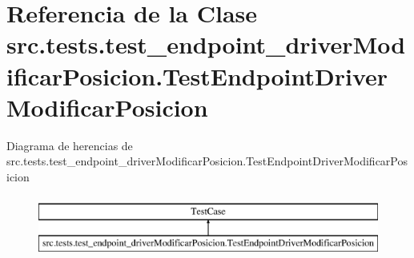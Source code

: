 \hypertarget{classsrc_1_1tests_1_1test__endpoint__driver_modificar_posicion_1_1_test_endpoint_driver_modificar_posicion}{\section{Referencia de la Clase src.\-tests.\-test\-\_\-endpoint\-\_\-driver\-Modificar\-Posicion.\-Test\-Endpoint\-Driver\-Modificar\-Posicion}
\label{classsrc_1_1tests_1_1test__endpoint__driver_modificar_posicion_1_1_test_endpoint_driver_modificar_posicion}
}
Diagrama de herencias de src.\-tests.\-test\-\_\-endpoint\-\_\-driver\-Modificar\-Posicion.\-Test\-Endpoint\-Driver\-Modificar\-Posicion\begin{figure}[H]
\begin{center}
\leavevmode
\includegraphics[height=2.000000cm]{classsrc_1_1tests_1_1test__endpoint__driver_modificar_posicion_1_1_test_endpoint_driver_modificar_posicion}
\end{center}
\end{figure}
